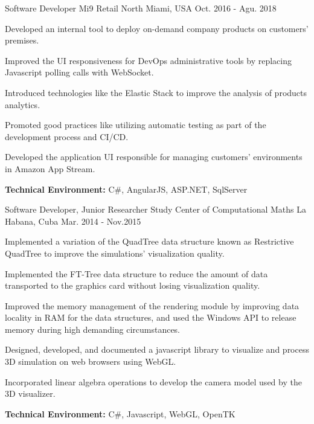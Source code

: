 \begin{cventries}
\workexperienceentry
{Software Developer} %
{Mi9 Retail} %
{North Miami, USA} %
{Oct. 2016 - Agu. 2018} %
{ %
\begin{cvitems}
    \item {Developed an internal tool to deploy on-demand company products on customers' premises.}
    \item {Improved the UI responsiveness for DevOps administrative tools by replacing Javascript polling calls with WebSocket.}
    \item {Introduced technologies like the Elastic Stack to improve the analysis of products analytics.}  
    \item {Promoted good practices like utilizing automatic testing as part of the development process and CI/CD.}
    \item {Developed the application UI responsible for managing customers' environments in Amazon App Stream.}
\end{cvitems}
}
{\textbf{Technical Environment:} C\#, AngularJS, ASP.NET, SqlServer}


\workexperienceentry
{Software Developer, Junior Researcher} %
{Study Center of Computational Maths} %
{La Habana, Cuba} %
{Mar. 2014 - Nov.2015} %
{ %
\begin{cvitems}
	\item {Implemented a variation of the QuadTree data structure known as Restrictive QuadTree to improve the simulations' visualization quality.}
	\item {Implemented the FT-Tree data structure to reduce the amount of data transported to the graphics card without losing visualization quality.}
	\item {Improved the memory management of the rendering module by improving data locality in RAM for the data structures, and used the Windows API to release memory during high demanding circumstances.}
	\item {Designed, developed, and documented a javascript library to visualize and process 3D simulation on web browsers
	using WebGL.}
	\item {Incorporated linear algebra operations to develop the camera model used by the 3D visualizer.}
\end{cvitems}
}
{\textbf{Technical Environment:} C\#, Javascript, WebGL, OpenTK}
\end{cventries}
